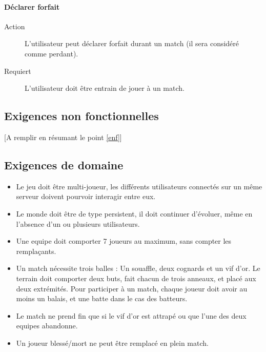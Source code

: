 \documentclass[a4paper]{article}
\begin{document}
\paragraph{Déclarer forfait}
\begin{description}
\item[Action] L'\gls{utilisateur} peut déclarer forfait durant un match (il sera considéré comme perdant).
\item[Requiert] L'utilisateur doit être entrain de jouer à un match.
\end{description}


\subsection{Exigences non fonctionnelles}
[A remplir en résumant le point \ref{enf}]


\subsection{Exigences de domaine}
\begin{itemize}
\item Le jeu doit être multi-joueur, les différents \glspl{utilisateur} connectés sur un même \gls{serveur} doivent pourvoir interagir entre eux.
\item Le monde doit être de type persistent, il doit continuer d'évoluer, même en l'absence d'un ou plusieurs \glspl{utilisateur}.
\item Une \gls{equipe} doit comporter 7 \glspl{joueur} au maximum, sans compter les remplaçants.
\item Un match nécessite trois balles : Un souaffle, deux cognards et un vif d'or. Le terrain doit comporter deux buts, fait chacun de trois anneaux, et placé aux deux extrémités. Pour participer à un match, chaque \gls{joueur} doit avoir au moins un balais, et une batte dans le cas des batteurs.
\item Le match ne prend fin que si le vif d'or est attrapé ou que l'une des deux \glspl{equipe} abandonne.
\item Un \gls{joueur} blessé/mort ne peut être remplacé en plein match.
\end{itemize}

\end{document}
